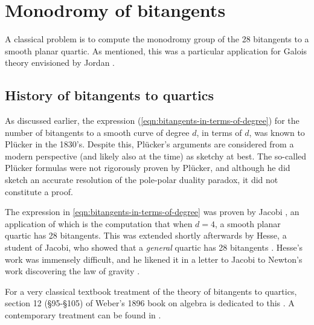 \documentclass[11pt]{amsart}
\begin{document}
\section{Monodromy of bitangents}

A classical problem is to compute the monodromy group of the 28 bitangents to a smooth planar quartic. As mentioned, this was a particular application for Galois theory envisioned by Jordan \cite[III.VI]{Jordan}.

\subsection{History of bitangents to quartics}

As discussed earlier, the expression (\autoref{eqn:bitangents-in-terms-of-degree}) for the number of bitangents to a smooth curve of degree $d$, in terms of $d$, was known to Pl\"{u}cker in the 1830's. Despite this, Pl\"{u}cker's arguments are considered from a modern perspective (and likely also at the time) as sketchy at best. The so-called Pl\"{u}cker formulas were not rigorously proven by Pl\"{u}cker, and although he did sketch an accurate resolution of the pole-polar duality paradox, it did not constitute a proof.

The expression in \autoref{eqn:bitangents-in-terms-of-degree} was proven by Jacobi \cite{Jacobi1850}, an application of which is the computation that when $d=4$, a smooth planar quartic has 28 bitangents. This was extended shortly afterwards by Hesse, a student of Jacobi, who showed that a \textit{general} quartic has 28 bitangents \cite{Hesse1855}. Hesse's work was immensely difficult, and he likened it in a letter to Jacobi to Newton's work discovering the law of gravity \cite[p.~165]{Gray-worlds}.

For a very classical textbook treatment of the theory of bitangents to quartics, section 12 (\S95-\S105) of Weber's 1896 book on algebra is dedicated to this \cite[\S95-\S105]{Weber1896}. A contemporary treatment can be found in \cite[\S6.1]{Dolgachev}.
\end{document}
